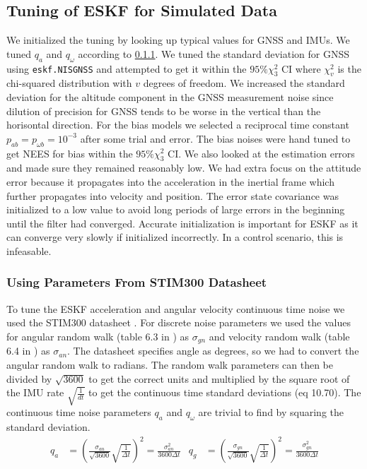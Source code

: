 \subsection{Tuning of ESKF for Simulated Data}
We initialized the tuning by looking up typical values for GNSS and IMUs. We tuned $q_a$ and $q_\omega$ according to \cref{sec:using_datasheet}. We tuned the standard deviation for GNSS using \texttt{eskf.NISGNSS} and attempted to get it within the $95\% \chi_3^2$ CI where $\chi_v^2$ is the chi-squared distribution with $v$ degrees of freedom. We increased the standard deviation for the altitude component in the GNSS measurement noise since dilution of precision for GNSS tends to be worse in the vertical than the horisontal direction. For the bias models we selected a reciprocal time constant $p_{ab} = p_{\omega b} = 10^{-3}$ after some trial and error. The bias noises were hand tuned to get NEES for bias within the $95\% \chi_3^2$ CI. We also looked at the estimation errors and made sure they remained reasonably low. We had extra focus on the attitude error because it propagates into the acceleration in the inertial frame which further propagates into velocity and position. The error state covariance was initialized to a low value to avoid long periods of large errors in the beginning until the filter had converged. Accurate initialization is important for ESKF as it can converge very slowly if initialized incorrectly. In a control scenario, this is infeasable.

\subsubsection{Using Parameters From STIM300 Datasheet}\label{sec:using_datasheet}
To tune the ESKF acceleration and angular velocity continuous time noise we used the STIM300 datasheet \cite{stim300}. For discrete noise parameters we used the values for angular random walk (table 6.3 in \cite{stim300}) as $\sigma_{gn}$ and velocity random walk (table 6.4 in \cite{stim300}) as $\sigma_{an}$.
The datasheet specifies angle as degrees, so we had to convert the angular random walk to radians.
The random walk parameters can then be divided by $\sqrt{3600}$ to get the correct units and multiplied by the square root of the IMU rate $\sqrt{\frac{1}{dt}}$ to get the continuous time standard deviations (eq 10.70\cite{edmund}). The continuous time noise parameters $q_a$ and $q_\omega$ are trivial to find by squaring the standard deviation.
\begin{align}
q_a &= (\frac{\sigma_{an}}{\sqrt{3600}} \sqrt{\frac{1}{\Delta t}})^2 = \frac{\sigma_{an}^2}{3600 \Delta t} & q_g &= (\frac{\sigma_{gn}}{\sqrt{3600}}\sqrt{\frac{1}{\Delta t}})^2 = \frac{\sigma_{gn}^2}{3600 \Delta t} \label{eq:eskf-cont-noise}
\end{align}

